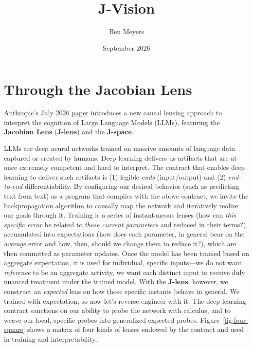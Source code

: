 \documentclass{article}
\title{J-Vision}
\author{Ben Meyers}
\date{September 2026}
\begin{document}
\maketitle

\section{Through the Jacobian Lens}

Anthropic's July 2026 \href{https://transformer-circuits.pub/2026/workspace/index.html}{paper} introduces a new causal lensing approach to interpret the cognition of Large Language Models (LLMs), featuring the \textbf{Jacobian Lens} (\textbf{J-lens}) and the \textbf{J-space}. 

LLMs are deep neural networks trained on massive amounts of language data captured or created by humans. Deep learning delivers us artifacts that are at once extremely competent and hard to interpret. The contract that enables deep learning to deliver such artifacts is (1) legible \textit{ends} (input/output) and (2) \textit{end-to-end} differentiability. By configuring our desired behavior (such as predicting text from text) as a program that complies with the above contract, we invite the backpropagation algorithm to causally map the network and iteratively realize our goals through it. Training is a series of instantaneous lenses (how can \textit{this specific error} be related to \textit{these current parameters} and reduced in their terms?), accumulated into expectations (how does each parameter, in general bear on the \textit{average} error and how, then, should we change them to reduce it?), which are then committed as parameter updates. Once the model has been trained based on aggregate expectation, it is used for individual, specific inputs---we do not want \textit{inference} to be an aggregate activity, we want each distinct input to receive duly nuanced treatment under the trained model. With the \textbf{J-lens}, however, we construct an \textit{expected} lens on how those specific instants behave in general. We trained with expectation, so now let's reverse-engineer with it. The deep learning contract sanctions on our ability to probe the network with calculus, and to weave our local, specific probes into generalized expected probes. Figure~\ref{fig:four-square} shows a matrix of four kinds of lenses endowed by the contract and used in training and interpretability. 
\end{document}
